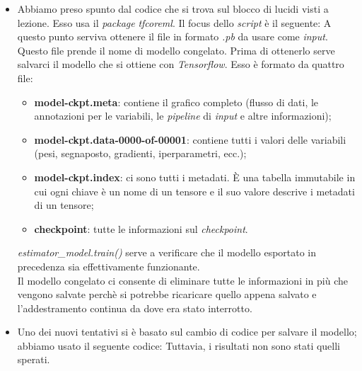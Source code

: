 \begin{itemize}
	\item Abbiamo preso spunto dal codice che si trova sul blocco di lucidi visti a lezione. Esso usa il \textit{package} \textit{tfcoreml}. Il focus dello \textit{script} è il seguente:
	\vspace*{2ex}
	\vspace*{2ex}
	A questo punto serviva ottenere il file in formato \textit{.pb} da usare come \textit{input}. Questo file prende il nome di modello congelato. Prima di ottenerlo serve salvarci il modello che si ottiene con \textit{Tensorflow}. Esso è formato da quattro file:
	\begin{itemize}
		\item \textbf{model-ckpt.meta}: contiene il grafico completo (flusso di dati, le annotazioni per le variabili, le \textit{pipeline} di \textit{input} e altre informazioni);
     	\item \textbf{model-ckpt.data-0000-of-00001}: contiene tutti i valori delle variabili (pesi, segnaposto, gradienti, iperparametri, ecc.);
     	\item \textbf{model-ckpt.index}: ci sono tutti i metadati. È una tabella immutabile in cui ogni chiave è un nome di un tensore e il suo valore descrive i metadati di un tensore;
     	\item \textbf{checkpoint}: tutte le informazioni sul \textit{checkpoint}.
	\end{itemize}
	\vspace*{2ex}
	\vspace*{2ex}
	\textit{estimator\_model.train()} serve a verificare che il modello esportato in precedenza sia effettivamente funzionante.\\
	\newline
	Il modello congelato ci consente di eliminare tutte le informazioni in più che vengono salvate perchè si potrebbe ricaricare quello appena salvato e l'addestramento continua da dove era stato interrotto.
	\vspace*{2ex}
	\vspace*{2ex}
	\item Uno dei nuovi tentativi si è basato sul cambio di codice per salvare il modello; abbiamo usato il seguente codice:
	\vspace*{2ex}
	\vspace*{2ex}
	Tuttavia, i risultati non sono stati quelli sperati.
	

\end{itemize}
